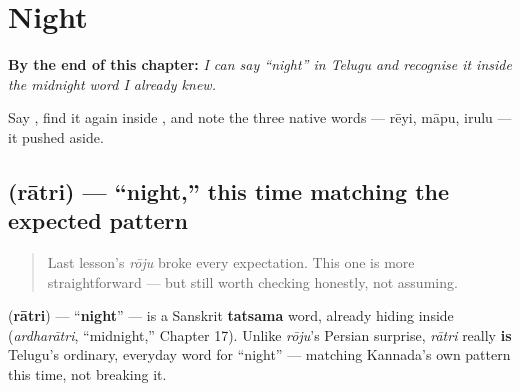 
\chapter{Night}
\label{ch:te-night}

\begin{chapteropening}
\textbf{By the end of this chapter:} \emph{I can say \textquotedblleft{}night\textquotedblright{} in Telugu and recognise it inside the midnight word I already knew.}

Say , find it again inside , and note the three native words — rēyi, māpu, irulu — it pushed aside.
\end{chapteropening}

\section[\texorpdfstring{\te{రాత్రి} (rātri)}{రాత్రి (rātri)}]{ (rātri) — \textquotedblleft{}night,\textquotedblright{} this time matching the expected pattern}

\label{lesson:TE-C24-ratri}



\begin{quote}
Last lesson's \emph{rōju} broke every expectation. This one is more straightforward — but still worth checking honestly, not assuming.
\end{quote}

\begin{cousinweb}
\textbf{} (\textbf{rātri}) — \textquotedblleft{}\textbf{night}\textquotedblright{} — is a Sanskrit \textbf{tatsama} word, already hiding inside \textbf{} (\emph{ardharātri}, \textquotedblleft{}midnight,\textquotedblright{} Chapter 17). Unlike \emph{rōju}'s Persian surprise, \emph{rātri} really \textbf{is} Telugu's ordinary, everyday word for \textquotedblleft{}night\textquotedblright{} — matching Kannada's own pattern this time, not breaking it.
\end{cousinweb}

